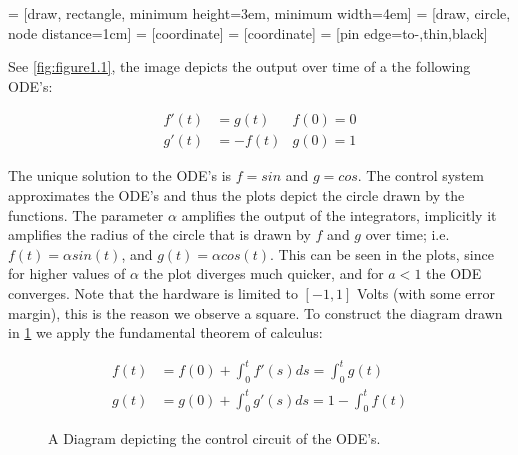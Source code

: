 \documentclass[british]{mscs-project}
\begin{document}
\makeMSCSTitle{}




 = [draw, rectangle,
   minimum height=3em, minimum width=4em]
 = [draw, circle, node distance=1cm]
 = [coordinate]
 = [coordinate]
 = [pin edge={to-,thin,black}]


\label{problem-1}
See \cref{fig:figure1.1}, the image depicts the output over time of a the following ODE's:


\begin{align*}
 f'(t) &= g(t) & f(0) = 0 \\
 g'(t) &= -f(t) & g(0) = 1
\end{align*}


The unique solution to the ODE's is $f = sin$ and $g = cos$. The control system approximates the ODE's and thus the plots depict the circle drawn by the functions. The parameter $\alpha$ amplifies the output of the integrators, implicitly it amplifies the radius of the circle that is drawn by $f$ and $g$ over time; i.e. $f(t) = \alpha sin(t)$, and $g(t) = \alpha cos(t)$. This can be seen in the plots, since for higher values of $\alpha$ the plot diverges much quicker, and for $a<1$ the ODE converges. Note that the hardware is limited to $[-1,1]$ Volts (with some error margin), this is the reason we observe a square. To construct the diagram drawn in \cref{fig:circuit} we apply the fundamental theorem of calculus:


\begin{align*}
 f(t) &= f(0) + \int_0^t f'(s)ds = \int_0^t g(t)  \\
 g(t) &= g(0) + \int_0^t g'(s)ds = 1 - \int_0^t f(t)
\end{align*}


\begin{figure}[h]
\centering
{}
\caption{A Diagram depicting the control circuit of the ODE's.}
 \label{fig:circuit}
\end{figure}
\end{document}
